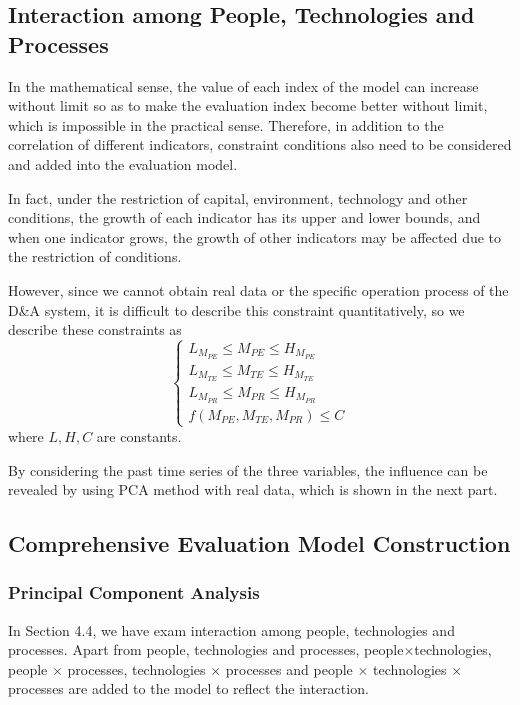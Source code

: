 \documentclass{mcmthesis}
\begin{document}
\subsection{Interaction among People, Technologies and Processes}

In the mathematical sense, the value of each index of the model can increase without limit so as to make the evaluation index become better without limit, which is impossible in the practical sense. Therefore, in addition to the correlation of different indicators, constraint conditions also need to be considered and added into the evaluation model.

In fact, under the restriction of capital, environment, technology and other conditions, the growth of each indicator has its upper and lower bounds, and when one indicator grows, the growth of other indicators may be affected due to the restriction of conditions.

However, since we cannot obtain real data or the specific operation process of the D\&A system, it is difficult to describe this constraint quantitatively, so we describe these constraints as
\begin{equation}
    \begin{cases}
    L_{M_{PE}} \leq M_{PE} \leq H_{M_{PE}} \\
    L_{M_{TE}} \leq M_{TE} \leq H_{M_{TE}} \\
    L_{M_{PR}} \leq M_{PR} \leq H_{M_{PR}} \\
    f(M_{PE},M_{TE},M_{PR}) \leq C
    \end{cases}
\end{equation}
where $L,H,C$ are constants.

By considering the past time series of the three variables, the influence can be revealed by using PCA method with real data, which is shown in the next part.

\subsection{Comprehensive Evaluation Model Construction}

\subsubsection{Principal Component Analysis}
In Section 4.4, we have exam interaction among people, technologies and processes. Apart from people, technologies and processes, people$\times$technologies, people $\times$ processes, technologies $\times$ processes and people $\times$ technologies $\times$ processes are added to the model to reflect the interaction. 
\end{document}
